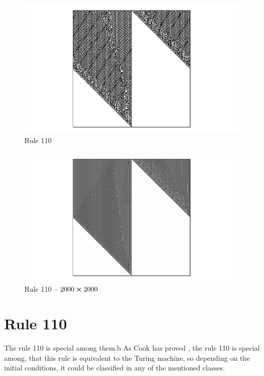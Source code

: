 \begin{figure}
 \centering
 \includegraphics[trim = 40mm 0mm 0mm 0mm, width=1.7\textwidth]{./img/110_500}
 \caption{Rule 110}
\end{figure}

\begin{figure}
 \centering
 \includegraphics[trim = 40mm 0mm 0mm 0mm, width=1.7\textwidth]{./img/110_2000}
 \caption{Rule 110 -- $2000 \cross 2000$}
\end{figure}


\section{Rule 110}
The rule 110 is special among them.b As Cook has proved \cite{cook}, the rule 110 is special among, that this rule is equivalent to the Turing machine, so depending on the initial conditions, it could be classified in any of the mentioned classes.


